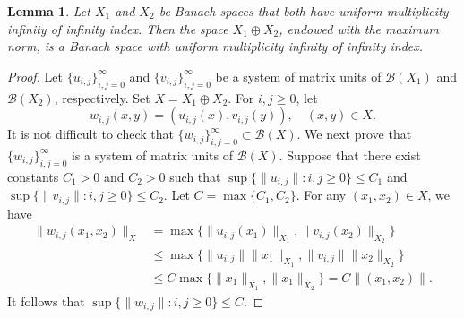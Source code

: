 \documentclass[12pt]{amsart}
\numberwithin{equation}{section}
\theoremstyle{plain}
\newtheorem{lem}[thm]{Lemma}
\theoremstyle{definition}
\newcommand{\B}{{\mathcal{B}}}
\begin{document}
\begin{lem}\label{S3:Duni}
Let $X_1$ and $X_2$ be Banach spaces that both have uniform multiplicity infinity of infinity index.
Then the space $X_1\oplus X_2$, endowed with the maximum norm, is a Banach space with uniform multiplicity infinity of infinity index.
\end{lem}
\begin{proof}
Let $\{u_{i,j}\}_{i,j=0}^{\infty}$ and $\{v_{i,j}\}_{i,j=0}^{\infty}$ be a system of matrix units of $\B(X_1)$ and $\B(X_2)$, respectively.
Set $X=X_1\oplus X_2$.
For $i,j\geq 0$, let
$$w_{i,j}(x,y)=(u_{i,j}(x),v_{i,j}(y)),\quad (x,y)\in X.$$
It is not difficult to check that $\{w_{i,j}\}_{i,j=0}^{\infty}\subset \B(X)$.
We next prove that $\{w_{i,j}\}_{i,j=0}^{\infty}$ is a system of matrix units of $\B(X)$.
Suppose that there exist constants $C_1>0$ and $C_2>0$ such that
$\sup\{\|u_{i,j}\|:i,j\geq 0\}\leq C_1$ and $\sup\{\|v_{i,j}\|:i,j\geq 0\}\leq C_2$.
Let $C=\max\{C_1,C_2\}$.
For any $(x_1,x_2)\in X$, we have
\begin{align*}
\|w_{i,j}(x_1,x_2)\|_{X}
&=\max\{\|u_{i,j}(x_1)\|_{X_1},\|v_{i,j}(x_2)\|_{X_2}\}\\
&\leq\max\{\|u_{i,j}\|\|x_1\|_{X_1},\|v_{i,j}\|\|x_2\|_{X_2}\}\\
&\leq C\max\{\|x_1\|_{X_1},\|x_1\|_{X_2}\}=C\|(x_1,x_2)\|.
\end{align*}
It follows that $\sup\{\|w_{i,j}\|:i,j\geq 0\}\leq C$.


\end{proof}
\end{document}
